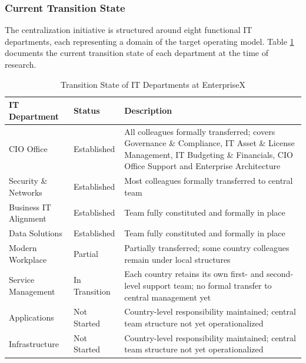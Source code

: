 \subsubsection{Current Transition State}
\label{subsubsec:CurrentTransitionState}
The centralization initiative is structured around eight functional IT departments, each representing a domain of the target operating model.
Table \ref{tab:TransitionState} documents the current transition state of each department at the time of research.

\begin{table}[H]
\centering
\caption{Transition State of IT Departments at EnterpriseX}
\label{tab:TransitionState}
\begin{tabularx}{\textwidth}{p{3.8cm} p{2.8cm} X}
\toprule
\textbf{IT Department} & \textbf{Status} & \textbf{Description} \\
\midrule
CIO Office & Established & All colleagues formally transferred; covers Governance \& Compliance, IT Asset \& License Management, IT Budgeting \& Financials, CIO Office Support and Enterprise Architecture \\
\addlinespace
Security \& Networks & Established & Most colleagues formally transferred to central team \\
\addlinespace
Business IT Alignment & Established & Team fully constituted and formally in place \\
\addlinespace
Data Solutions & Established & Team fully constituted and formally in place \\
\addlinespace
Modern Workplace & Partial & Partially transferred; some country colleagues remain under local structures \\
\addlinespace
Service Management & In Transition & Each country retains its own first- and second-level support team; no formal transfer to central management yet \\
\addlinespace
Applications & Not Started & Country-level responsibility maintained; central team structure not yet operationalized \\
\addlinespace
Infrastructure & Not Started & Country-level responsibility maintained; central team structure not yet operationalized \\
\bottomrule
\end{tabularx}
\end{table}

